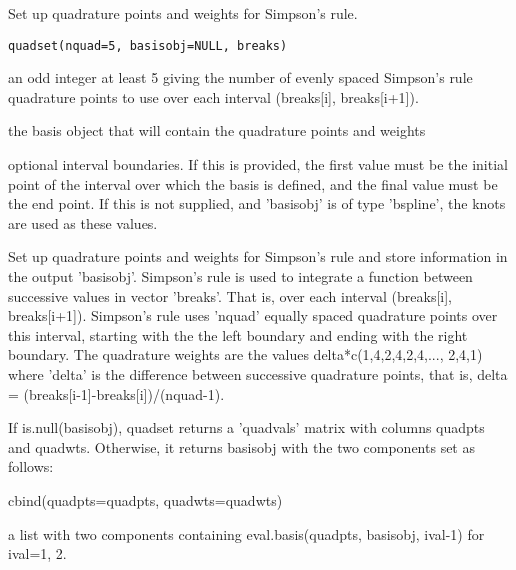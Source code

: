 \documentclass{article}
\begin{document}
\begin{Description}\relax
Set up quadrature points and weights for Simpson's rule.
\end{Description}
\begin{Usage}
\begin{verbatim}
quadset(nquad=5, basisobj=NULL, breaks) 
\end{verbatim}
\end{Usage}
\begin{Arguments}
\begin{ldescription}
\item[\code{nquad}] an odd integer at least 5 giving the number of evenly spaced
Simpson's rule quadrature points to use over each interval
(breaks[i], breaks[i+1]). 

\item[\code{basisobj}] the basis object that will contain the quadrature points and weights

\item[\code{breaks}] optional interval boundaries.  If this is provided, the first value
must be the initial point of the interval over which the basis is
defined, and the final value must be the end point.  If this is not
supplied, and 'basisobj' is of type 'bspline', the knots are used as
these values.

\end{ldescription}
\end{Arguments}
\begin{Details}\relax
Set up quadrature points and weights for Simpson's rule and store
information in the output 'basisobj'.  Simpson's rule is used to
integrate a function between successive values in vector 'breaks'.
That is, over each interval (breaks[i], breaks[i+1]).  Simpson's rule
uses 'nquad' equally spaced quadrature points over this interval,
starting with the the left boundary and ending with the right
boundary.  The quadrature weights are the values
delta*c(1,4,2,4,2,4,..., 2,4,1) where 'delta' is the difference
between successive quadrature points, that is, delta =
(breaks[i-1]-breaks[i])/(nquad-1).
\end{Details}
\begin{Value}
If is.null(basisobj), quadset returns a 'quadvals' matrix with columns
quadpts and quadwts.  Otherwise, it returns basisobj with the
two components set as follows:   

\begin{ldescription}
\item[\code{quadvals}] cbind(quadpts=quadpts, quadwts=quadwts)    

\item[\code{value}] a list with two components containing eval.basis(quadpts, basisobj,
ival-1) for ival=1, 2.  

\end{ldescription}
\end{Value}
\end{document}

